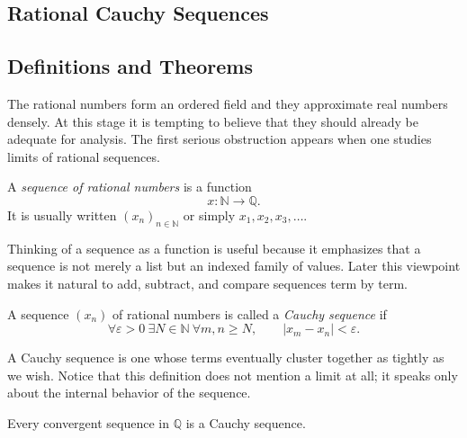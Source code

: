 
\subsection{Rational Cauchy Sequences}
\label{sec:rational-cauchy}

\subsection{Definitions and Theorems}

The rational numbers form an ordered field and they approximate real numbers densely.  At this
stage it is tempting to believe that they should already be adequate for analysis.  The first serious
obstruction appears when one studies limits of rational sequences.

\begin{definition}
\label{def:rational-sequence}
A \emph{sequence of rational numbers} is a function
\[
x:\mathbb{N}\to\mathbb{Q}.
\]
It is usually written $(x_n)_{n\in\mathbb{N}}$ or simply $x_1,x_2,x_3,\dots$.
\end{definition}

\begin{remark}
Thinking of a sequence as a function is useful because it emphasizes that a sequence is not merely a
list but an indexed family of values.  Later this viewpoint makes it natural to add, subtract, and
compare sequences term by term.
\end{remark}

\begin{definition}
\label{def:cauchy-rational}
A sequence $(x_n)$ of rational numbers is called a \emph{Cauchy sequence} if
\[
\forall \varepsilon>0\ \exists N\in\mathbb{N}\ \forall m,n\ge N,
\qquad
|x_m-x_n|<\varepsilon.
\]
\end{definition}

\begin{remark}
A Cauchy sequence is one whose terms eventually cluster together as tightly as we wish.  Notice that
this definition does not mention a limit at all; it speaks only about the internal behavior of the
sequence.
\end{remark}

\begin{theorem}
\label{thm:convergent-implies-cauchy-q}
Every convergent sequence in $\mathbb{Q}$ is a Cauchy sequence.
\end{theorem}

